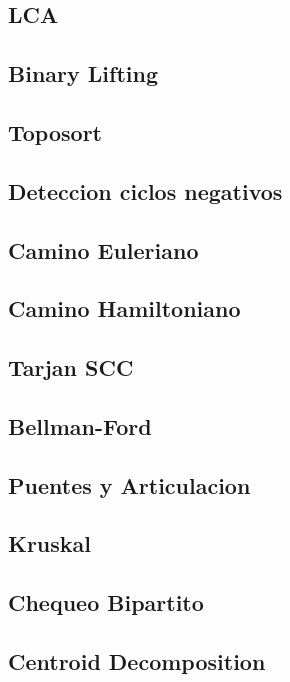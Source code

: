 \documentclass[a4paper,11pt,landscape,twocolumn]{article}
\begin{document}
\subsection{LCA}

\subsection{Binary Lifting}

\subsection{Toposort}

\subsection{Deteccion ciclos negativos}

\subsection{Camino Euleriano}

\subsection{Camino Hamiltoniano}

\subsection{Tarjan SCC}

\subsection{Bellman-Ford}

\subsection{Puentes y Articulacion}

\subsection{Kruskal}

\subsection{Chequeo Bipartito}

\subsection{Centroid Decomposition}

\end{document}
